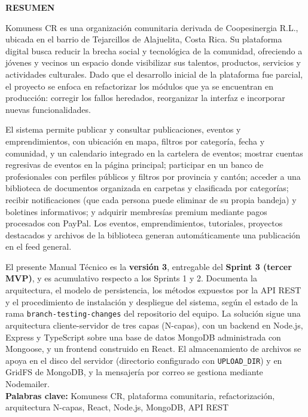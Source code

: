 \begin{center}
\thispagestyle{empty}
\vspace{2cm}
\LARGE{\textbf{RESUMEN}}\\[1.0cm]
\end{center}
\thispagestyle{empty}
Komuness CR es una organización comunitaria derivada de Coopesinergia R.L., ubicada en el barrio de Tejarcillos de Alajuelita, Costa Rica. Su plataforma digital busca reducir la brecha social y tecnológica de la comunidad, ofreciendo a jóvenes y vecinos un espacio donde visibilizar sus talentos, productos, servicios y actividades culturales. Dado que el desarrollo inicial de la plataforma fue parcial, el proyecto se enfoca en refactorizar los módulos que ya se encuentran en producción: corregir los fallos heredados, reorganizar la interfaz e incorporar nuevas funcionalidades.

El sistema permite publicar y consultar publicaciones, eventos y emprendimientos, con ubicación en mapa, filtros por categoría, fecha y comunidad, y un calendario integrado en la cartelera de eventos; mostrar cuentas regresivas de eventos en la página principal; participar en un banco de profesionales con perfiles públicos y filtros por provincia y cantón; acceder a una biblioteca de documentos organizada en carpetas y clasificada por categorías; recibir notificaciones (que cada persona puede eliminar de su propia bandeja) y boletines informativos; y adquirir membresías premium mediante pagos procesados con PayPal. Los eventos, emprendimientos, tutoriales, proyectos destacados y archivos de la biblioteca generan automáticamente una publicación en el feed general.

El presente Manual Técnico es la \textbf{versión 3}, entregable del \textbf{Sprint 3 (tercer MVP)}, y es acumulativo respecto a los Sprints 1 y 2. Documenta la arquitectura, el modelo de persistencia, los métodos expuestos por la API REST y el procedimiento de instalación y despliegue del sistema, según el estado de la rama \texttt{branch-testing-changes} del repositorio del equipo. La solución sigue una arquitectura cliente-servidor de tres capas (N-capas), con un backend en Node.js, Express y TypeScript sobre una base de datos MongoDB administrada con Mongoose, y un frontend construido en React. El almacenamiento de archivos se apoya en el disco del servidor (directorio configurado con \texttt{UPLOAD\_DIR}) y en GridFS de MongoDB, y la mensajería por correo se gestiona mediante Nodemailer.\\
\textbf{Palabras clave: }Komuness CR, plataforma comunitaria, refactorización, arquitectura N-capas, React, Node.js, MongoDB, API REST
